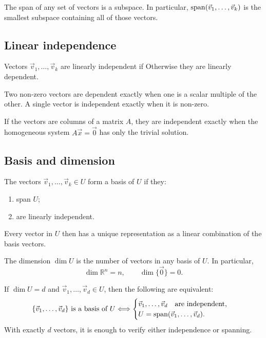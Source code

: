 \documentclass{article}
\begin{document}
The span of any set of vectors is a subspace. In particular,
$\operatorname{span}(\vec{v}_1,\dots,\vec{v}_k)$ is the smallest subspace containing
all of those vectors.

\subsection{Linear independence}
Vectors $\vec{v}_1,\dots,\vec{v}_k$ are linearly independent if
Otherwise they are linearly dependent.

Two non-zero vectors are dependent exactly when one is a scalar
multiple of the other. A single vector is independent exactly when it
is non-zero.

If the vectors are columns of a matrix $A$, they are independent
exactly when the homogeneous system $A\vec{x}=\vec{0}$ has only the
trivial solution.

\subsection{Basis and dimension}
The vectors $\vec{v}_1,\dots,\vec{v}_k\in U$ form a basis of $U$ if
they:
\begin{enumerate}
    \item span $U$;
    \item are linearly independent.
\end{enumerate}
Every vector in $U$ then has a unique representation as a linear
combination of the basis vectors.

The dimension $\dim U$ is the number of vectors in any basis of $U$.
In particular,
\[
    \dim\mathbb{R}^n=n,\qquad \dim\{\vec{0}\}=0.
\]

If $\dim U=d$ and $\vec{v}_1,\dots,\vec{v}_d\in U$, then the following
are equivalent:
\[
    \{\vec{v}_1,\dots,\vec{v}_d\}\text{ is a basis of }U
    \Longleftrightarrow
    \begin{cases}
        \vec{v}_1,\dots,\vec{v}_d\quad\text{are independent},\\
        U=\operatorname{span}(\vec{v}_1,\dots,\vec{v}_d).
    \end{cases}
\]
With exactly $d$ vectors, it is enough to verify either independence
or spanning.
\end{document}
